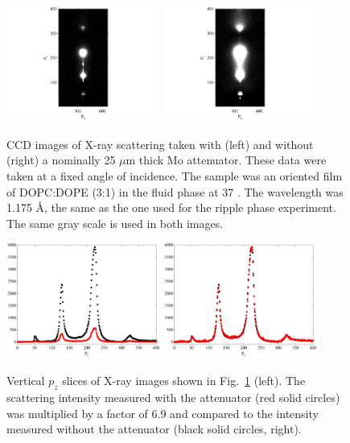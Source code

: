 \begin{figure}
  \centering
  \includegraphics[trim=100 0 100 0,clip,width=0.45\textwidth]{figures/ripple/olddopc045}
  \includegraphics[trim=100 0 100 0,clip,width=0.45\textwidth]{figures/ripple/olddopc044}
  \caption{CCD images of X-ray scattering taken with (left) and without 
  (right) a nominally 25 $\mu$m thick Mo attenuator. These data were taken 
  at a fixed angle of incidence. The sample was an oriented film of 
  DOPC:DOPE (3:1) in the fluid phase at 37 \textcelsius. The wavelength
  was 1.175 \AA, the same as the one used for the ripple phase experiment.
  The same gray scale is used in both images.}
  \label{fig:olddopc}
\end{figure}

\begin{figure}
  \centering
  \includegraphics[width=0.45\textwidth]{figures/ripple/attenuator1}
  \includegraphics[width=0.45\textwidth]{figures/ripple/attenuator2}
  \caption{Vertical $p_z$ slices of X-ray images shown in Fig.~\ref{fig:olddopc}
  (left). The scattering intensity measured with the attenuator (red solid circles) 
  was multiplied by 
  a factor of 6.9 and compared to the intensity measured 
  without the attenuator (black solid circles, right).}
  \label{fig:attenuator}
\end{figure}

